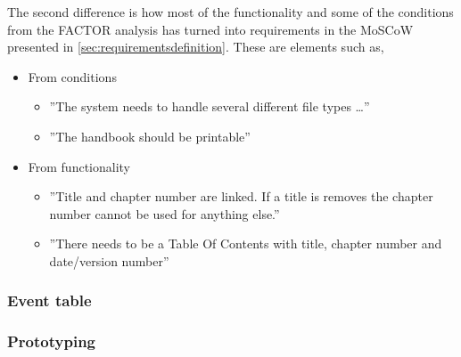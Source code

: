 The second difference is how most of the functionality and some of the conditions from the FACTOR analysis has turned into requirements in the MoSCoW presented in \cref{sec:requirementsdefinition}. These are elements such as,
\begin{itemize}
	\item From conditions
	\begin{itemize}
		\item 
		''The system needs to handle several different file types \ldots''
		\item 
		''The handbook should be printable''
	\end{itemize}
	\item From functionality
	\begin{itemize}
		\item 
		''Title and chapter number are linked. If a title is removes the chapter number cannot be used for anything else.''
		\item 
		''There needs to be a Table Of Contents with title, chapter number and date/version number''
	\end{itemize}
\end{itemize}

\subsubsection*{Event table}

\subsubsection*{Prototyping}



